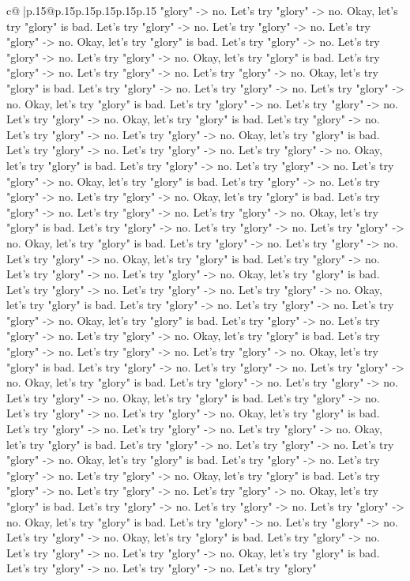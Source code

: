 \documentclass{article}
\begin{document}
{\begin{supertabular}{c@{$\;$}|p{.15\linewidth}@{}p{.15\linewidth}p{.15\linewidth}p{.15\linewidth}p{.15\linewidth}p{.15\linewidth}}
{{{"glory" {-}> no. Let's try "glory" {-}> no. Okay, let's try "glory" is bad. Let's try "glory" {-}> no. Let's try "glory" {-}> no. Let's try "glory" {-}> no. Okay, let's try "glory" is bad. Let's try "glory" {-}> no. Let's try "glory" {-}> no. Let's try "glory" {-}> no. Okay, let's try "glory" is bad. Let's try "glory" {-}> no. Let's try "glory" {-}> no. Let's try "glory" {-}> no. Okay, let's try "glory" is bad. Let's try "glory" {-}> no. Let's try "glory" {-}> no. Let's try "glory" {-}> no. Okay, let's try "glory" is bad. Let's try "glory" {-}> no. Let's try "glory" {-}> no. Let's try "glory" {-}> no. Okay, let's try "glory" is bad. Let's try "glory" {-}> no. Let's try "glory" {-}> no. Let's try "glory" {-}> no. Okay, let's try "glory" is bad. Let's try "glory" {-}> no. Let's try "glory" {-}> no. Let's try "glory" {-}> no. Okay, let's try "glory" is bad. Let's try "glory" {-}> no. Let's try "glory" {-}> no. Let's try "glory" {-}> no. Okay, let's try "glory" is bad. Let's try "glory" {-}> no. Let's try "glory" {-}> no. Let's try "glory" {-}> no. Okay, let's try "glory" is bad. Let's try "glory" {-}> no. Let's try "glory" {-}> no. Let's try "glory" {-}> no. Okay, let's try "glory" is bad. Let's try "glory" {-}> no. Let's try "glory" {-}> no. Let's try "glory" {-}> no. Okay, let's try "glory" is bad. Let's try "glory" {-}> no. Let's try "glory" {-}> no. Let's try "glory" {-}> no. Okay, let's try "glory" is bad. Let's try "glory" {-}> no. Let's try "glory" {-}> no. Let's try "glory" {-}> no. Okay, let's try "glory" is bad. Let's try "glory" {-}> no. Let's try "glory" {-}> no. Let's try "glory" {-}> no. Okay, let's try "glory" is bad. Let's try "glory" {-}> no. Let's try "glory" {-}> no. Let's try "glory" {-}> no. Okay, let's try "glory" is bad. Let's try "glory" {-}> no. Let's try "glory" {-}> no. Let's try "glory" {-}> no. Okay, let's try "glory" is bad. Let's try "glory" {-}> no. Let's try "glory" {-}> no. Let's try "glory" {-}> no. Okay, let's try "glory" is bad. Let's try "glory" {-}> no. Let's try "glory" {-}> no. Let's try "glory" {-}> no. Okay, let's try "glory" is bad. Let's try "glory" {-}> no. Let's try "glory" {-}> no. Let's try "glory" {-}> no. Okay, let's try "glory" is bad. Let's try "glory" {-}> no. Let's try "glory" {-}> no. Let's try "glory" {-}> no. Okay, let's try "glory" is bad. Let's try "glory" {-}> no. Let's try "glory" {-}> no. Let's try "glory" {-}> no. Okay, let's try "glory" is bad. Let's try "glory" {-}> no. Let's try "glory" {-}> no. Let's try "glory" {-}> no. Okay, let's try "glory" is bad. Let's try "glory" {-}> no. Let's try "glory" {-}> no. Let's try "glory" {-}> no. Okay, let's try "glory" is bad. Let's try "glory" {-}> no. Let's try "glory" {-}> no. Let's try "glory" {-}> no. Okay, let's try "glory" is bad. Let's try "glory" {-}> no. Let's try "glory" {-}> no. Let's try "glory" {-}> no. Okay, let's try "glory" is bad. Let's try "glory" {-}> no. Let's try "glory" {-}> no. Let's try "glory" {-}> no. Okay, let's try "glory" is bad. Let's try "glory" {-}> no. Let's try "glory" {-}> no. Let's try "glory" {-}> no. Okay, let's try "glory" is bad. Let's try "glory" {-}> no. Let's try "glory" {-}> no. Let's try "glory" }}}
\end{supertabular}}
\end{document}
